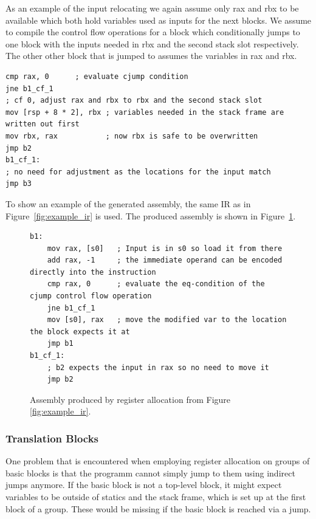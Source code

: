 \documentclass[course=eragp]{aspdoc}
\begin{document}
\par

As an example of the input relocating we again assume only rax and rbx to be available which both hold variables used as inputs for the next blocks.
We assume to compile the control flow operations for a block which conditionally jumps to one block with the inputs needed in rbx and the second stack slot respectively.
The other other block that is jumped to assumes the variables in rax and rbx.
\begin{lstlisting}[language={[x86masm]Assembler},float=h]
cmp rax, 0      ; evaluate cjump condition
jne b1_cf_1
; cf 0, adjust rax and rbx to rbx and the second stack slot
mov [rsp + 8 * 2], rbx ; variables needed in the stack frame are written out first
mov rbx, rax           ; now rbx is safe to be overwritten
jmp b2
b1_cf_1:
; no need for adjustment as the locations for the input match
jmp b3
\end{lstlisting}

\FloatBarrier

To show an example of the generated assembly, the same IR as in Figure~\ref{fig:example_ir} is used.
The produced assembly is shown in Figure~\ref{fig:reg_gen_asm}.

\begin{figure}[h]
    \centering
    \begin{lstlisting}[language={[x86masm]Assembler}]
b1:
    mov rax, [s0]   ; Input is in s0 so load it from there
    add rax, -1     ; the immediate operand can be encoded directly into the instruction
    cmp rax, 0      ; evaluate the eq-condition of the cjump control flow operation
    jne b1_cf_1
    mov [s0], rax   ; move the modified var to the location the block expects it at
    jmp b1
b1_cf_1:
    ; b2 expects the input in rax so no need to move it
    jmp b2
\end{lstlisting}
    \caption{Assembly produced by register allocation from Figure \ref{fig:example_ir}.}\label{fig:reg_gen_asm}
\end{figure}

\subsubsection{Translation Blocks}\label{translation_blocks}
One problem that is encountered when employing register allocation on groups of basic blocks
is that the programm cannot simply jump to them using indirect jumps anymore.
If the basic block is not a top-level block, it might expect variables to be outside of statics and the stack frame, which is set
up at the first block of a group. These would be missing if the basic block is reached via a jump.
\end{document}
